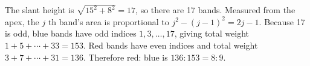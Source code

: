The slant height is $\sqrt{15^2+8^2}=17 $, so there are 17 bands. Measured from the apex, the $ j $ th band's area is proportional to $ j^2-(j-1)^2=2j-1 $. Because 17 is odd, blue bands have odd indices $ 1,3,\ldots,17 $, giving total weight $ 1+5+\cdots+33=153 $. Red bands have even indices and total weight $ 3+7+\cdots+31=136 $. Therefore red: blue is $ 136:153=\boxed{8:9}$.
